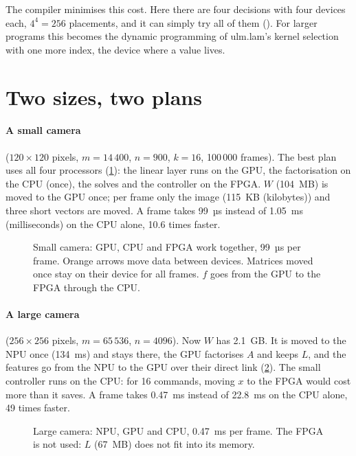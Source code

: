 \documentclass[11pt,a4paper]{article}
\let\origtexttt\texttt
\renewcommand{\texttt}[1]{\highLight[ttbg]{\origtexttt{#1}}}
\begin{document}
The compiler minimises this cost. Here there are four decisions with four
devices each, \(4^4 = 256\) placements, and it can simply try all of them
(\texttt{model.py}). For larger programs this becomes the dynamic
programming of ulm.lam's kernel selection with one more index, the device
where a value lives.

\section{Two sizes, two plans}

\paragraph{A small camera} (\(120\times120\) pixels, \(m = 14\,400\),
\(n = 900\), \(k = 16\), 100\,000 frames). The best plan uses all four
processors (\cref{fig:small}): the linear layer runs on the GPU, the
factorisation on the CPU (once), the solves and the controller on the FPGA.
\(W\) (104~MB) is moved to the GPU once; per frame only the image (115~KB
(kilobytes)) and three short vectors are moved. A frame takes 99~µs
instead of 1.05~ms (milliseconds) on the CPU alone, 10.6 times faster.

\begin{figure}[h]
\centering

\caption{Small camera: GPU, CPU and FPGA work together, 99~µs per frame.
Orange arrows move data between devices. Matrices moved once stay on
their device for all frames. \(f\) goes from the GPU to the
FPGA through the CPU.}
\label{fig:small}
\end{figure}

\paragraph{A large camera} (\(256\times256\) pixels, \(m = 65\,536\),
\(n = 4096\)). Now \(W\) has 2.1~GB. It is moved to the NPU once (134~ms)
and stays there, the GPU factorises \(A\) and keeps \(L\), and the features
go from the NPU to the GPU over their direct link (\cref{fig:large}). The
small controller runs on the CPU: for 16 commands, moving \(x\) to the FPGA
would cost more than it saves. A frame takes 0.47~ms instead of 22.8~ms on
the CPU alone, 49 times faster.

\begin{figure}[h]
\centering

\caption{Large camera: NPU, GPU and CPU, 0.47~ms per frame. The FPGA is
not used: \(L\) (67~MB) does not fit into its memory.}
\label{fig:large}
\end{figure}
\end{document}
